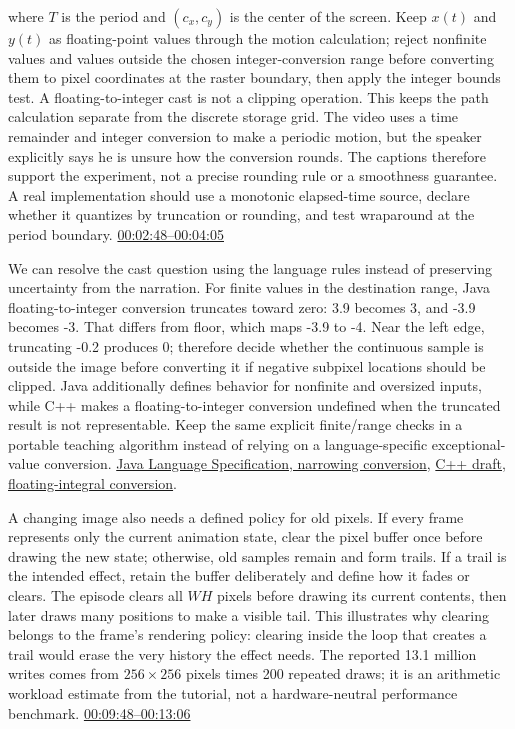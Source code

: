 where \(T\) is the period and \((c_x,c_y)\) is the center of the screen. Keep \(x(t)\) and \(y(t)\) as floating-point values through the motion calculation; reject nonfinite values and values outside the chosen integer-conversion range before converting them to pixel coordinates at the raster boundary, then apply the integer bounds test. A floating-to-integer cast is not a clipping operation. This keeps the path calculation separate from the discrete storage grid. The video uses a time remainder and integer conversion to make a periodic motion, but the speaker explicitly says he is unsure how the conversion rounds. The captions therefore support the experiment, not a precise rounding rule or a smoothness guarantee. A real implementation should use a monotonic elapsed-time source, declare whether it quantizes by truncation or rounding, and test wraparound at the period boundary. \href{https://www.youtube.com/watch?v=dwn_UrItwfw&t=168s}{00:02:48--00:04:05}

We can resolve the cast question using the language rules instead of preserving uncertainty from the narration. For finite values in the destination range, Java floating-to-integer conversion truncates toward zero: 3.9 becomes 3, and -3.9 becomes -3. That differs from floor, which maps -3.9 to -4. Near the left edge, truncating -0.2 produces 0; therefore decide whether the continuous sample is outside the image before converting it if negative subpixel locations should be clipped. Java additionally defines behavior for nonfinite and oversized inputs, while C++ makes a floating-to-integer conversion undefined when the truncated result is not representable. Keep the same explicit finite/range checks in a portable teaching algorithm instead of relying on a language-specific exceptional-value conversion. \href{https://docs.oracle.com/javase/specs/jls/se21/html/jls-5.html\#jls-5.1.3}{Java Language Specification, narrowing conversion}, \href{https://eel.is/c++draft/conv.fpint}{C++ draft, floating-integral conversion}.

A changing image also needs a defined policy for old pixels. If every frame represents only the current animation state, clear the pixel buffer once before drawing the new state; otherwise, old samples remain and form trails. If a trail is the intended effect, retain the buffer deliberately and define how it fades or clears. The episode clears all \(WH\) pixels before drawing its current contents, then later draws many positions to make a visible tail. This illustrates why clearing belongs to the frame's rendering policy: clearing inside the loop that creates a trail would erase the very history the effect needs. The reported 13.1 million writes comes from \(256\times256\) pixels times 200 repeated draws; it is an arithmetic workload estimate from the tutorial, not a hardware-neutral performance benchmark. \href{https://www.youtube.com/watch?v=dwn_UrItwfw&t=588s}{00:09:48--00:13:06}

